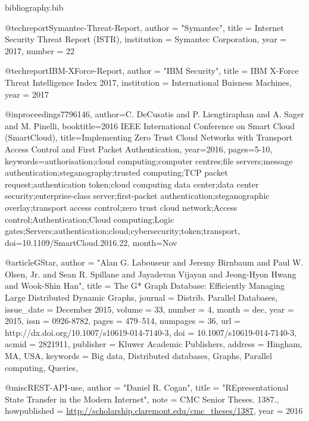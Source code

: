 \begin{filecontents}{bibliography.bib}

@techreport{Symantec-Threat-Report,
    author = "{Symantec}",
    title = {{Internet Security Threat Report (ISTR)}},
    institution = {Symantec Corporation}, 
    year = {2017},
    number = {22}
}

@techreport{IBM-XForce-Report,
    author = "{IBM Security}",
    title = {{IBM X-Force Threat Intelligence Index 2017}},
    institution = {International Buisness Machines},
    year = {2017}
}

@inproceedings{7796146, 
    author={C. DeCusatis and P. Liengtiraphan and A. Sager and M. Pinelli}, 
    booktitle={2016 IEEE International Conference on Smart Cloud (SmartCloud)}, 
    title={Implementing Zero Trust Cloud Networks with Transport Access Control and First Packet Authentication}, 
    year={2016}, 
    pages={5-10}, 
    keywords={authorisation;cloud computing;computer centres;file servers;message authentication;steganography;trusted computing;TCP packet request;authentication token;cloud computing data center;data center security;enterprise-class server;first-packet authentication;steganographic overlay;transport access control;zero trust cloud network;Access control;Authentication;Cloud computing;Logic gates;Servers;authentication;cloud;cybersecurity;token;transport}, 
    doi={10.1109/SmartCloud.2016.22}, 
    month={Nov}
}

@article{GStar,
    author = "{Alan G. Labouseur and Jeremy Birnbaum and Paul W. Olsen, Jr. and Sean R. Spillane and Jayadevan Vijayan and Jeong-Hyon Hwang and Wook-Shin Han}",
    title = {{The G* Graph Database: Efficiently Managing Large Distributed Dynamic Graphs}},
    journal = {Distrib. Parallel Databases},
    issue_date = {December  2015},
    volume = {33},
    number = {4},
    month = dec,
    year = {2015},
    issn = {0926-8782},
    pages = {479--514},
    numpages = {36},
    url = {http://dx.doi.org/10.1007/s10619-014-7140-3},
    doi = {10.1007/s10619-014-7140-3},
    acmid = {2821911},
    publisher = {Kluwer Academic Publishers},
    address = {Hingham, MA, USA},
    keywords = {Big data, Distributed databases, Graphs, Parallel computing, Queries},
}


@misc{REST-API-use,
    author = "{Daniel R. Cogan}",
    title = {{"REpresentational State Transfer in the Modern Internet"}},
    note = {CMC Senior Theses. 1387.},
    howpublished = {\url{http://scholarship.claremont.edu/cmc_theses/1387}},
    year = {2016}
}


\end{filecontents}
